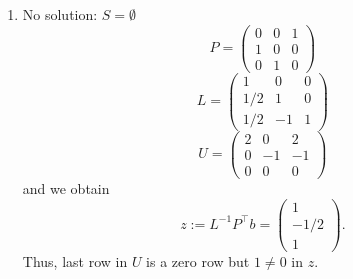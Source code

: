 {\begin{enumerate}
$$\begin{array}{l}
				\Rightarrow\ \ 3x_1+2x_2+3x_3=4\ \ \Rightarrow\ \ x_1 =\frac{1}{3}(4-2x_2-3x_3)=\frac{3}{2} - \frac{1}{2}x_3				
				\end{array}
				$$
				\begin{align*}
				\Rightarrow\ \ S&:=\{x\in\mathbb{R}^3: Ax=b\}\\
				&=\{x\in\mathbb{R}^3:x_1=\tfrac{1}{2}(3 - x_3), ~~x_2= -\tfrac{1}{4}(1+3x_3), ~~x_3\in\mathbb{R}\}\\
				&\stackrel{\textcolor{blue}{s:=x_3\in\mathbb{R}^3}}{=}\begin{Bmatrix} \begin{pmatrix}\frac{3}{2}\\-\frac{1}{4}\\0\end{pmatrix}+s\begin{pmatrix}-\frac{1}{2}\\-\frac{3}{4}\\1\end{pmatrix}:s\in\mathbb{R}\end{Bmatrix},
				\text{(i.e., we have infinitely many solutions!)}
				\end{align*}
	\item No solution: $S = \emptyset$\\

			$$P = \begin{pmatrix}
	0&0&1\\1&0&0\\0&1&0
	\end{pmatrix} $$
	$$L = \begin{pmatrix}
	1&0&0\\
	1/2&1&0\\
	1/2&-1&1
	\end{pmatrix} $$
	$$U = \begin{pmatrix}
2&0&2\\
	0&-1&-1\\
	0&0&0
	\end{pmatrix} $$
			and we obtain
	$$z:= L^{-1} P^\top b = \begin{pmatrix}
	1\\ -1/2\\ 1
	\end{pmatrix}. $$
	Thus, last row in $U$ is a zero row but $1\neq 0$ in $z$.
\end{enumerate}

}
